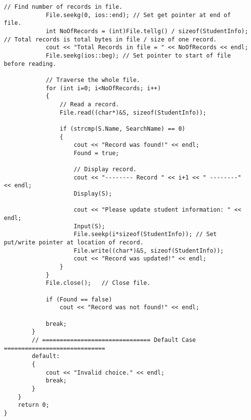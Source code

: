 \documentclass[12pt,a4paper]{article}
\begin{document}
\begin{lstlisting}[caption={Random access in binary file}]
			// Find number of records in file.
			File.seekg(0, ios::end); // Set get pointer at end of file.
			int NoOfRecords = (int)File.tellg() / sizeof(StudentInfo); // Total records is total bytes in file / size of one record.
			cout << "Total Records in file = " << NoOfRecords << endl;
			File.seekg(ios::beg); // Set pointer to start of file before reading.

			// Traverse the whole file.
			for (int i=0; i<NoOfRecords; i++)
			{
				// Read a record.
				File.read((char*)&S, sizeof(StudentInfo));

				if (strcmp(S.Name, SearchName) == 0)
				{
					cout << "Record was found!" << endl;
					Found = true;

					// Display record.
					cout << "-------- Record " << i+1 << " --------" << endl;
					Display(S);

					cout << "Please update student information: " << endl;
					Input(S);
					File.seekp(i*sizeof(StudentInfo)); // Set put/write pointer at location of record.
					File.write((char*)&S, sizeof(StudentInfo));
					cout << "Record was updated!" << endl;
				}
			}
			File.close();	// Close file.

			if (Found == false)
				cout << "Record was not found!" << endl;

			break;
		}
		// =============================== Default Case =============================
		default:
		{
			cout << "Invalid choice." << endl;
			break;
		}
	}
	return 0;
}
\end{lstlisting}
\end{document}
